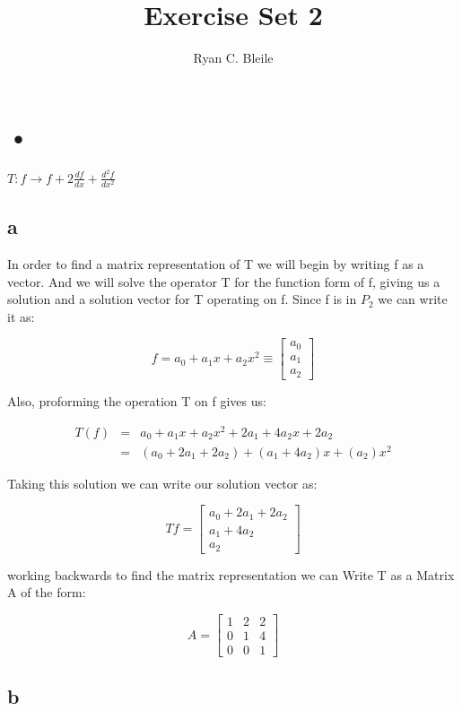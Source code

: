 \documentclass[12pt]{article}
\title{Exercise Set 2}
\author{Ryan C. Bleile}
\begin{document}
\maketitle

\section{•}

$T : f \rightarrow f + 2 \frac{df}{dx} + \frac{d^{2}f}{dx^{2}} $

\subsection*{a}

In order to find a matrix representation of T we will begin by writing f as a vector. And we will solve the operator T for the function form of f, giving us a solution and a solution vector for T operating on f. Since f is in $P_{2}$ we can write it as: 

\[
f = a_{0} + a_{1}x + a_{2}x^{2} \equiv 
\begin{bmatrix}
a_{0}\\ 
a_{1}\\ 
a_{2}
\end{bmatrix}
\]

Also, proforming the operation T on f gives us:

\begin{eqnarray*}
T(f) &=& a_{0} + a_{1}x + a_{2}x^{2} + 2a_{1} + 4a_{2}x + 2a_{2}\\
&=&(a_{0} + 2a_{1} + 2a_{2}) + (a_{1} + 4a_{2})x + (a_{2})x^{2}
\end{eqnarray*}

Taking this solution we can write our solution vector as:

\[
T{f} = 
\begin{bmatrix}
a_{0} + 2a_{1} + 2a_{2}\\ 
a_{1} + 4a_{2}\\
a_{2}
\end{bmatrix}
\]

working backwards to find the matrix representation we can Write T as a Matrix A of the form:

\[
A = 
\begin{bmatrix}
1 & 2 & 2\\
0 & 1 & 4\\
0 & 0 & 1
\end{bmatrix}
\]

\subsection*{b}
\end{document}
